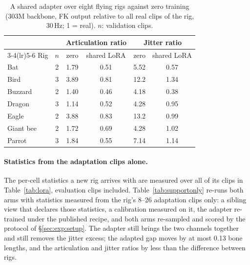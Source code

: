 \begin{table}[h]
\centering\footnotesize\setlength{\tabcolsep}{5pt}
\caption{A shared adapter over eight flying rigs against zero training (\num{303}M backbone, FK output relative to all real clips of
the rig, 30\,Hz; 1 = real). $n$: validation clips.}\label{tab:flyers}
\begin{tabular}{@{}lccccc@{}}
\toprule
& & \multicolumn{2}{c}{Articulation ratio} & \multicolumn{2}{c}{Jitter ratio} \\
\cmidrule(lr){3-4}\cmidrule(lr){5-6}
Rig & $n$ & zero & shared LoRA & zero & shared LoRA \\
\midrule
Bat & 2 & \num{1.79} & \num{0.51} & \num{5.52} & \num{0.57} \\
Bird & 3 & \num{3.89} & \num{0.81} & \num{12.2} & \num{1.34} \\
Buzzard & 2 & \num{1.40} & \num{0.46} & \num{4.18} & \num{0.38} \\
Dragon & 3 & \num{1.14} & \num{0.52} & \num{4.28} & \num{0.95} \\
Eagle & 2 & \num{3.88} & \num{0.83} & \num{13.2} & \num{0.99} \\
Giant bee & 2 & \num{1.72} & \num{0.69} & \num{4.28} & \num{1.02} \\
Parrot & 3 & \num{1.84} & \num{0.55} & \num{7.14} & \num{1.14} \\
\bottomrule
\end{tabular}
\end{table}




\paragraph{Statistics from the adaptation clips alone.} The per-cell statistics a new rig arrives with are
measured over all of its clips in Table~\ref{tab:lora}, evaluation clips included. Table~\ref{tab:supportonly}
re-runs both arms with statistics measured from the rig's \num{8}--\num{26} adaptation clips only: a sibling view
that declares those statistics, a calibration measured on it, the adapter re-trained under the published recipe,
and both arms re-sampled and scored by the protocol of \S\ref{sec:exp:setup}. The adapter still brings the two
channels together and still removes the jitter excess; the adapted gap moves by at most \num{0.13} bone lengths, and the
articulation and jitter ratios by less than the difference between rigs.

